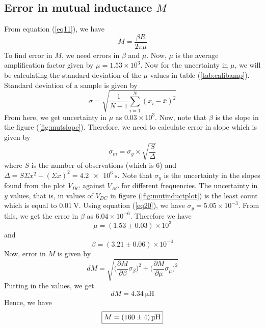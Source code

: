 \documentclass[%
 reprint,
nofootinbib,
 amsmath,amssymb,
 aps,
]{revtex4-2}
\begin{document}
    \subsection{Error in mutual inductance $M$}
        From equation (\ref{eq11}), we have
        \begin{equation}
            M = \dfrac{\beta R}{2 \pi \mu}
        \end{equation}
        To find error in $M$, we need errors in $\beta$ and $\mu$. Now, $\mu$ is the average amplification factor given by $\mu = 1.53 \times 10^3$. Now for the uncertainty in $\mu$, we will be calculating the standard deviation of the $\mu$ values in table (\ref{tab:calibamp}). Standard deviation of a sample is given by
        \begin{equation}
            \sigma = \sqrt{\dfrac{1}{N-1} \sum_{i=1}^{N} (x_i - \bar x)^2}
        \end{equation}
        From here, we get uncertainty in $\mu$ as $0.03 \times 10^3$. Now, note that $\beta$ is the slope in the figure (\ref{fig:mutslope}). Therefore, we need to calculate error in slope which is given by
        \begin{equation}
        \label{eq20}
            \sigma_m = \sigma_y \times \sqrt{\dfrac{S}{\Delta}}
        \end{equation}
        where $S$ is the number of observations (which is 6) and $\Delta = S \Sigma x^2 - (\Sigma x)^2 = \SI{4.2e6}{\second}$. Note that $\sigma_y$ is the uncertainty in the slopes found from the plot $V_{DC}$ against $V_{AC}$ for different frequencies. The uncertainty in $y$ values, that is, in values of $V_{DC}$ in figure (\ref{fig:mutinductplot}) is the least count which is equal to $\SI{0.01}{\volt}$. Using equation (\ref{eq20}), we have $\sigma_y = 5.05 \times 10^{-3}$. From this, we get the error in $\beta$ as $6.04 \times 10^{-6}$. Therefore we have
        \begin{equation}
            \label{eq21}
            \mu = (1.53 \pm 0.03) \times 10^3
        \end{equation}
        and
        \begin{equation}
            \beta = (3.21 \pm 0.06) \times 10^{-4}
        \end{equation}
        Now, error in $M$ is given by
        \begin{equation}
            dM = \sqrt{\Big(\dfrac{\partial M}{\partial \beta} \sigma_{\beta}\Big)^2 + \Big(\dfrac{\partial M}{\partial \mu} \sigma_{\mu}\Big)^2}
        \end{equation}
        Putting in the values, we get
        \begin{equation}
            dM = \SI{4.34}{\micro \henry}
        \end{equation}
        Hence, we have
        \begin{equation}
            \boxed{M = \SI[separate-uncertainty=true]{160 \pm 4}{\micro \henry}}
        \end{equation}
    
\end{document}
